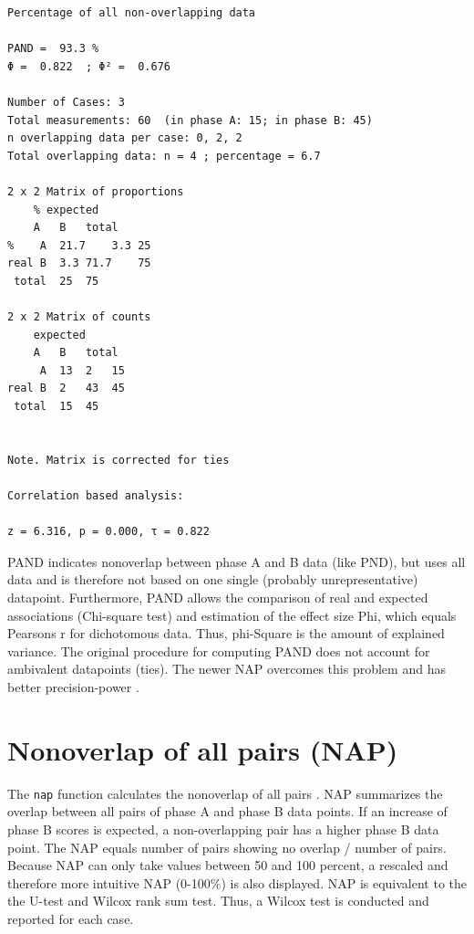 \documentclass[
]{book}
\begin{document}
\begin{verbatim}
Percentage of all non-overlapping data

PAND =  93.3 %
Φ =  0.822  ; Φ² =  0.676 

Number of Cases: 3 
Total measurements: 60  (in phase A: 15; in phase B: 45)
n overlapping data per case: 0, 2, 2
Total overlapping data: n = 4 ; percentage = 6.7 

2 x 2 Matrix of proportions
    % expected
    A   B   total
%    A  21.7    3.3 25
real B  3.3 71.7    75
 total  25  75

2 x 2 Matrix of counts
    expected
    A   B   total
     A  13  2   15
real B  2   43  45
 total  15  45


Note. Matrix is corrected for ties

Correlation based analysis:

z = 6.316, p = 0.000, τ = 0.822 
\end{verbatim}

PAND indicates nonoverlap between phase A and B data (like PND), but uses all data and is therefore not based on one single (probably unrepresentative) datapoint. Furthermore, PAND allows the comparison of real and expected associations (Chi-square test) and estimation of the effect size Phi, which equals Pearsons r for dichotomous data. Thus, phi-Square is the amount of explained variance. The original procedure for computing PAND does not account for ambivalent datapoints (ties). The newer NAP overcomes this problem and has better precision-power \citep{parker_effect_2011}.

\hypertarget{nonoverlap-of-all-pairs-nap}{%
\section{Nonoverlap of all pairs (NAP)}\label{nonoverlap-of-all-pairs-nap}}

The \texttt{nap} function calculates the nonoverlap of all pairs \citep{parker_improved_2009}. NAP summarizes the overlap between all pairs of phase A and phase B data points. If an increase of phase B scores is expected, a non-overlapping pair has a higher phase B data point. The NAP equals number of pairs showing no overlap / number of pairs. Because NAP can only take values between 50 and 100 percent, a rescaled and therefore more intuitive NAP (0-100\%) is also displayed. NAP is equivalent to the the U-test and Wilcox rank sum test. Thus, a Wilcox test is conducted and reported for each case.
\end{document}
